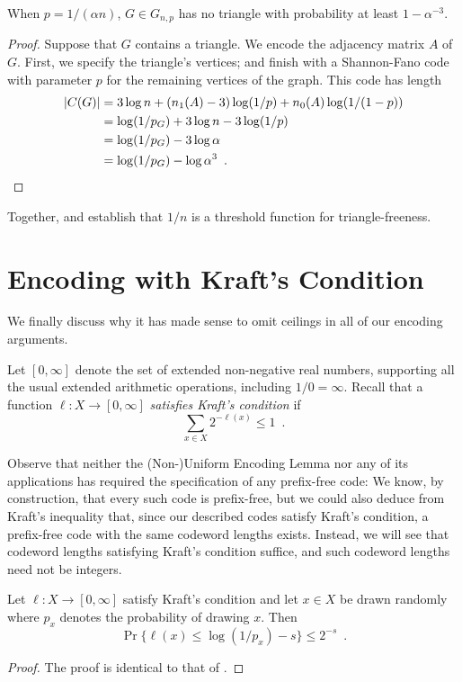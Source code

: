 \documentclass{patmorin}
\begin{document}
\begin{thm}
  When $p = 1/(\alpha n)$, $G \in G_{n, p}$ has no triangle with
  probability at least $1 - \alpha^{-3}$.
\end{thm}
\begin{proof}
  Suppose that $G$ contains a triangle. We encode the adjacency matrix
  $A$ of $G$. First, we specify the triangle's vertices; and finish
  with a Shannon-Fano code with parameter $p$ for the remaining
  vertices of the graph. This code has length
  \begin{align*}
    |C(G)| &= 3 \log n + (n_1(A) - 3) \log (1/p) + n_0(A) \log (1/(1 - p)) \\
           &= \log (1/p_G) + 3 \log n - 3 \log (1/p) \\
           &= \log (1/p_G) - 3 \log \alpha \\
           &= \log (1/p_G) - \log \alpha^3 \enspace . \qedhere
  \end{align*}
\end{proof}

Together,  and  establish
that $1/n$ is a threshold function for triangle-freeness.

\section{Encoding with Kraft's Condition}

We finally discuss why it has made sense to omit ceilings in all of
our encoding arguments.

Let $[0, \infty]$ denote the set of extended non-negative real
numbers, supporting all the usual extended arithmetic operations,
including $1/0 = \infty$. Recall that a function $\ell : X \to [0,
\infty]$ \emph{satisfies Kraft's condition} if
\[
  \sum_{x \in X} 2^{-\ell(x)} \leq 1 \enspace .
\]

Observe that neither the (Non-)Uniform Encoding Lemma nor any of its
applications has required the specification of any prefix-free code:
We know, by construction, that every such code is prefix-free, but we
could also deduce from Kraft's inequality that, since our described
codes satisfy Kraft's condition, a prefix-free code with the same
codeword lengths exists. Instead, we will see that codeword lengths
satisfying Kraft's condition suffice, and such codeword lengths need
not be integers.

\begin{lem}
  Let $\ell : X \to [0, \infty]$ satisfy Kraft's condition and let
  $x\in X$ be drawn randomly where $p_x$ denotes the probability of
  drawing $x$.  Then
  \[
    \Pr\{ \ell(x) \le \log(1/p_x)-s\} \le 2^{-s} \enspace .
  \]
\end{lem}
\begin{proof}
  The proof is identical to that of .
\end{proof}
\end{document}
